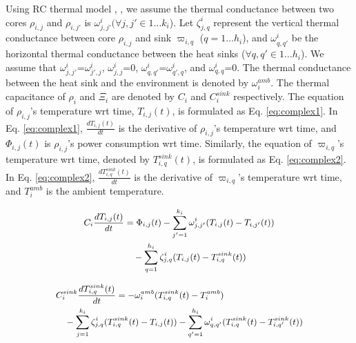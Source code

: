 \documentclass[conference]{IEEEtran}
\begin{document}
Using RC thermal model \cite{Chantem10}, \cite{Fisher09}, we assume the thermal conductance between two cores $\rho_{i,j}$ and $\rho_{i,j'}$ is
$\omega^{i}_{j,j'} (\forall j,j' \in 1\ldots k_i$). %
Let $\zeta^{i}_{j,q}$ represent the vertical thermal conductance
between core $\rho_{i,j}$ and sink $\varpi_{i,q}$ ($q=1\ldots h_i$), and $\omega^{i}_{q,q'}$ be the horizontal thermal conductance between
the heat sinks ($\forall q,q' \in 1\ldots h_i$).
We assume that $\omega^{i}_{j,j'}$=$\omega^{i}_{j',j}$, $\omega^{i}_{j,j}$=$0$, $\omega^{i}_{q,q'}$=$\omega^{i}_{q',q}$, and
$\omega^{i}_{q,q}$=$0$. The thermal conductance between the heat sink and the environment is denoted by $\omega_i^{amb}$.
The thermal capacitance of $\rho_i$ and $\Xi_i$ are denoted by $C_i$ and $C^{sink}_i$ respectively.
The equation of $\rho_{i,j}$'s temperature wrt time, $T_{i,j}(t)$, is formulated as  Eq. \ref{eq:complex1}.
In  Eq. \ref{eq:complex1}, $\frac{dT_{i,j}(t)}{dt}$ is the derivative of $\rho_{i,j}$'s  temperature wrt time, and
$\Phi_{i,j}(t)$ is $\rho_{i,j}$'s power consumption wrt time.
Similarly, the equation of $\varpi_{i,q}$'s temperature wrt time, denoted by $T^{sink}_{i,q}(t)$, is formulated as  Eq. \ref{eq:complex2}.
In  Eq. \ref{eq:complex2}, $\frac{dT^{sink}_{i,q}(t)}{dt}$ is the derivative of $\varpi_{i,q}$'s temperature wrt time, and
$T_i^{amb}$ is the ambient temperature.


\vspace{-0.2in}

\begin{equation}\label{eq:complex1}
\footnotesize
\begin{split}
	C_i \frac{dT_{i,j}(t)}{dt} &= \Phi_{i,j}(t) - \sum_{j'=1}^{k_i} \omega^{i}_{j,j'} ( T_{i,j}(t) - T_{i,j'}(t) ) \\
	&\quad  - \sum_{q=1}^{h_i} \zeta^{i}_{j,q} ( T_{i,j}(t) - T^{sink}_{i,q}(t) )
\end{split}
\end{equation}

\vspace{-0.23in}

\begin{equation}\label{eq:complex2}
\footnotesize
\begin{split}
	&C^{sink}_i \frac{dT^{sink}_{i,q}(t)}{dt} = - \omega_i^{amb} (T_{i,q}^{sink}(t) - T_i^{amb}) \\
 	&\quad - \sum_{j=1}^{k_i} \zeta^{i}_{j,q} (T^{sink}_{i,q}(t) - T_{i,j}(t)) %
	 	- \sum_{q'=1}^{h_i} \omega^{i}_{q,q'} (T^{sink}_{i,q}(t) - T^{sink}_{i,q'}(t) )
\end{split}
\end{equation}
\end{document}
